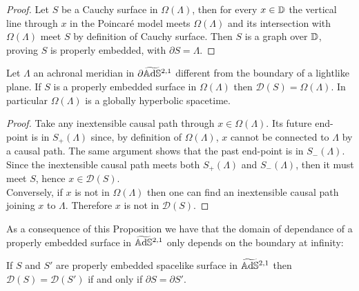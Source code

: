 \begin{proof}
    Let $S$ be a Cauchy surface in $\Omega(\Lambda)$, then for every $x\in \mathbb{D}$ the vertical line through $x$ in the Poincaré model meets $\Omega(\Lambda)$ and its intersection with $\Omega(\Lambda)$ meet $S$ by definition of Cauchy surface. Then $S$ is a graph over $\mathbb{D}$, proving $S$ is properly embedded, with $\partial S = \Lambda$.
\end{proof}
\begin{proposition}
    Let $\Lambda$ an achronal meridian in $\partial\widetilde{\mathbb{A}\mathrm{d}\mathbb{S}}{}^{2,1}$ different from the boundary of a lightlike plane. If $S$ is a properly embedded surface in $\Omega(\Lambda)$ then $\mathcal{D}(S) = \Omega(\Lambda)$. In particular $\Omega(\Lambda)$ is a globally hyperbolic spacetime. 
\end{proposition}
\begin{proof}
    Take any inextensible causal path through $x\in \Omega(\Lambda)$. Its future end-point is in $S_+(\Lambda)$ since, by definition of $\Omega(\Lambda)$, $x$ cannot be connected to $\Lambda$ by a causal path. The same argument shows that the past end-point is in $S_-(\Lambda)$. Since the inextensible causal path meets both $S_+(\Lambda)$ and $S_-(\Lambda)$, then it must meet $S$, hence $x\in \mathcal{D}(S)$.\\
    Conversely, if $x$ is not in $\Omega(\Lambda)$ then one can find an inextensible causal path joining $x$ to $\Lambda$. Therefore $x$ is not in $\mathcal{D}(S)$.
\end{proof}
As a consequence of this Proposition we have that the domain of dependance of a properly embedded surface in $\widetilde{\mathbb{A}\mathrm{d}\mathbb{S}}{}^{2,1}$ only depends on the boundary at infinity:
\begin{corollary}
    If $S$ and $S'$ are properly embedded spacelike surface in $\widetilde{\mathbb{A}\mathrm{d}\mathbb{S}}{}^{2,1}$ then $\mathcal{D}(S) = \mathcal{D}(S')$ if and only if $\partial S = \partial S'$.
\end{corollary}

